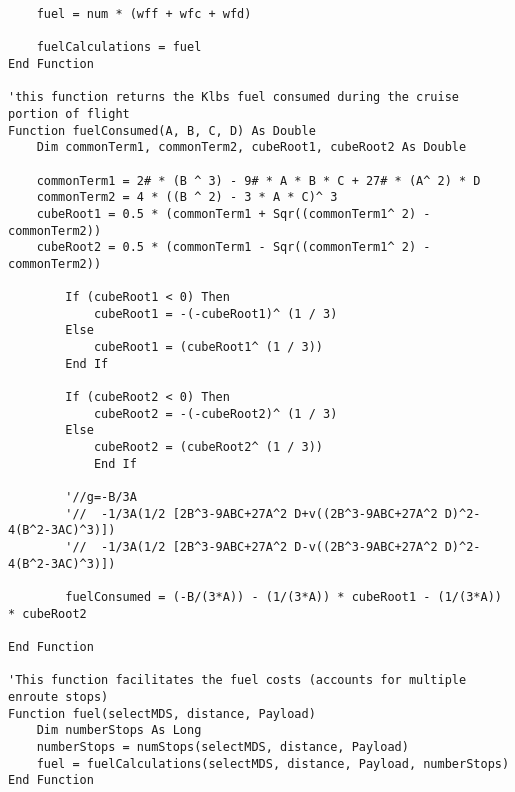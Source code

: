\begin{lstlisting}
    fuel = num * (wff + wfc + wfd)
     
    fuelCalculations = fuel
End Function

'this function returns the Klbs fuel consumed during the cruise portion of flight
Function fuelConsumed(A, B, C, D) As Double
    Dim commonTerm1, commonTerm2, cubeRoot1, cubeRoot2 As Double
    
    commonTerm1 = 2# * (B ^ 3) - 9# * A * B * C + 27# * (A^ 2) * D
    commonTerm2 = 4 * ((B ^ 2) - 3 * A * C)^ 3
    cubeRoot1 = 0.5 * (commonTerm1 + Sqr((commonTerm1^ 2) - commonTerm2))
    cubeRoot2 = 0.5 * (commonTerm1 - Sqr((commonTerm1^ 2) - commonTerm2))
    
        If (cubeRoot1 < 0) Then
            cubeRoot1 = -(-cubeRoot1)^ (1 / 3)
        Else
            cubeRoot1 = (cubeRoot1^ (1 / 3))
        End If
    
        If (cubeRoot2 < 0) Then
            cubeRoot2 = -(-cubeRoot2)^ (1 / 3)
        Else
            cubeRoot2 = (cubeRoot2^ (1 / 3))
            End If
    
        '//g=-B/3A
        '//  -1/3A(1/2 [2B^3-9ABC+27A^2 D+v((2B^3-9ABC+27A^2 D)^2-4(B^2-3AC)^3)])
        '//  -1/3A(1/2 [2B^3-9ABC+27A^2 D-v((2B^3-9ABC+27A^2 D)^2-4(B^2-3AC)^3)])
        
        fuelConsumed = (-B/(3*A)) - (1/(3*A)) * cubeRoot1 - (1/(3*A)) * cubeRoot2

End Function

'This function facilitates the fuel costs (accounts for multiple enroute stops) 
Function fuel(selectMDS, distance, Payload)
    Dim numberStops As Long
    numberStops = numStops(selectMDS, distance, Payload)
    fuel = fuelCalculations(selectMDS, distance, Payload, numberStops)
End Function
\end{lstlisting}
